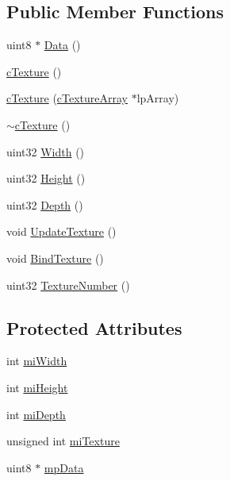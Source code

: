 \subsection*{Public Member Functions}
\begin{DoxyCompactItemize}
\item 
uint8 $\ast$ \hyperlink{classc_texture_a4a331456a8e7d0856ffeab1f53b3c82b}{Data} ()
\item 
\hyperlink{classc_texture_a9c2cfe21558d59e5118ca578d2a78393}{cTexture} ()
\item 
\hyperlink{classc_texture_a0caaa555739681b8beca2cf27e2f5073}{cTexture} (\hyperlink{classc_texture_array}{cTextureArray} $\ast$lpArray)
\item 
\hyperlink{classc_texture_ab36117dec3bd83f919ae431c7dcbaad5}{$\sim$cTexture} ()
\item 
uint32 \hyperlink{classc_texture_affc7cdbd5fc8163c96d2a189724d4f35}{Width} ()
\item 
uint32 \hyperlink{classc_texture_a1a6b4f4c5dccb2394f77c25c063e1fe0}{Height} ()
\item 
uint32 \hyperlink{classc_texture_a41f9d823cb268548887646ae65e8f979}{Depth} ()
\item 
void \hyperlink{classc_texture_a9b74aa84390b76935adccf59ba4cb41b}{UpdateTexture} ()
\item 
void \hyperlink{classc_texture_ac449f5e59f7d85146b47a75e332a0b20}{BindTexture} ()
\item 
uint32 \hyperlink{classc_texture_a3c036c0eab20c300e421d282deebb62d}{TextureNumber} ()
\end{DoxyCompactItemize}
\subsection*{Protected Attributes}
\begin{DoxyCompactItemize}
\item 
int \hyperlink{classc_texture_a1ecd8f15575d19e74da1c98c87b1180b}{miWidth}
\item 
int \hyperlink{classc_texture_a11e76c70a7fad493a21d4e7fabb1fcde}{miHeight}
\item 
int \hyperlink{classc_texture_afd2c9e6be5842f8bc34e86b2f9b27389}{miDepth}
\item 
unsigned int \hyperlink{classc_texture_a2cb17befe78a334841fd638209769fee}{miTexture}
\item 
uint8 $\ast$ \hyperlink{classc_texture_a0ecab78514040b6542e6616ee480d2d9}{mpData}
\end{DoxyCompactItemize}


